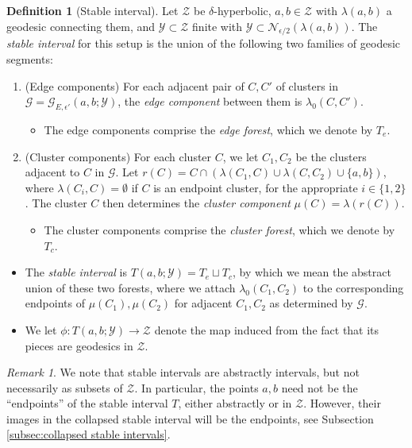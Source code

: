 \documentclass{amsart}
\theoremstyle{definition}
\newtheorem{definition}[theorem]{Definition}
\theoremstyle{remark}
\newtheorem{remark}[theorem]{Remark}
\theoremstyle{definition}
\newcommand{\calG}{\mathcal{G}}
\newcommand{\calN}{\mathcal{N}}
\newcommand{\calY}{\mathcal{Y}}
\newcommand{\calZ}{\mathcal{Z}}
\begin{document}
\begin{definition}[Stable interval]\label{defn:stable interval}
Let $\calZ$ be $\delta$-hyperbolic, $a,b \in \calZ$ with $\lambda(a,b)$ a geodesic connecting them, and $\calY \subset \calZ$ finite with $\calY \subset \calN_{\epsilon/2}(\lambda(a,b))$.  The \emph{stable interval} for this setup is the union of the following two families of geodesic segments:

\begin{enumerate}
\item (Edge components) For each adjacent pair of $C, C'$ of clusters in $\calG = \calG_{E,\epsilon'}(a,b;\calY)$, the \emph{edge component} between them is $\lambda_0(C,C')$.
\begin{itemize}
\item The edge components comprise the \emph{edge forest}, which we denote by $T_e$.
\end{itemize}
\item (Cluster components) For each cluster $C$, we let $C_1,C_2$ be the clusters adjacent to $C$ in $\calG$.  Let $r(C) = C \cap (\lambda(C_1,C) \cup \lambda(C,C_2) \cup \{a,b\})$, where $\lambda(C_i,C) = \emptyset$ if $C$ is an endpoint cluster, for the appropriate $i \in \{1,2\}$.  The cluster $C$ then determines the \emph{cluster component} $\mu(C) = \lambda(r(C))$.
\begin{itemize}
\item The cluster components comprise the \emph{cluster forest}, which we denote by $T_c$.
\end{itemize} 
\end{enumerate}

\begin{itemize}
\item The \emph{stable interval} is  $T(a,b; \calY) = T_e \sqcup T_c$, by which we mean the abstract union of these two forests, where we attach $\lambda_0(C_1,C_2)$ to the corresponding endpoints of $\mu(C_1), \mu(C_2)$ for adjacent $C_1, C_2$ as determined by $\calG$.
\item We let $\phi:T(a,b;\calY) \to \calZ$ denote the map induced from the fact that its pieces are geodesics in $\calZ$. 
\end{itemize}
\end{definition}




\begin{remark}
    We note that stable intervals are abstractly intervals, but not necessarily as subsets of $\calZ$.  In particular, the points $a,b$ need not be the ``endpoints'' of the stable interval $T$, either abstractly or in $\calZ$.  However, their images in the collapsed stable interval will be the endpoints, see Subsection \ref{subsec:collapsed stable intervals}.
\end{remark}
\end{document}
